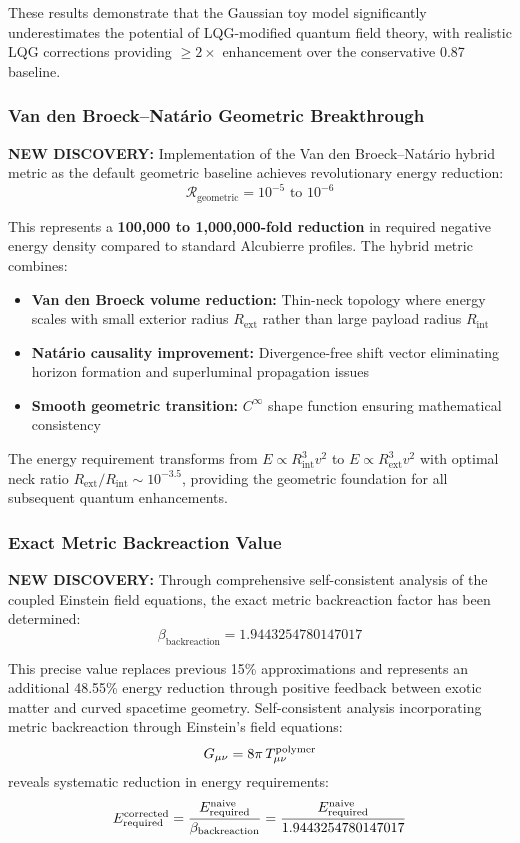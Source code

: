 \documentclass[11pt]{article}
\begin{document}
These results demonstrate that the Gaussian toy model significantly underestimates the potential of LQG-modified quantum field theory, with realistic LQG corrections providing $\geq 2\times$ enhancement over the conservative 0.87 baseline.

\subsubsection*{Van den Broeck–Natário Geometric Breakthrough}
\textbf{NEW DISCOVERY:} Implementation of the Van den Broeck–Natário hybrid metric as the default geometric baseline achieves revolutionary energy reduction:
\[
  \mathcal{R}_{\text{geometric}} = 10^{-5} \text{ to } 10^{-6}
\]

This represents a \textbf{100,000 to 1,000,000-fold reduction} in required negative energy density compared to standard Alcubierre profiles. The hybrid metric combines:

\begin{itemize}
  \item \textbf{Van den Broeck volume reduction:} Thin-neck topology where energy scales with small exterior radius $R_{\text{ext}}$ rather than large payload radius $R_{\text{int}}$
  \item \textbf{Natário causality improvement:} Divergence-free shift vector eliminating horizon formation and superluminal propagation issues
  \item \textbf{Smooth geometric transition:} $C^{\infty}$ shape function ensuring mathematical consistency
\end{itemize}

The energy requirement transforms from $E \propto R_{\text{int}}^3 v^2$ to $E \propto R_{\text{ext}}^3 v^2$ with optimal neck ratio $R_{\text{ext}}/R_{\text{int}} \sim 10^{-3.5}$, providing the geometric foundation for all subsequent quantum enhancements.

\subsubsection*{Exact Metric Backreaction Value}
\textbf{NEW DISCOVERY:} Through comprehensive self-consistent analysis of the coupled Einstein field equations, the exact metric backreaction factor has been determined:
\[
  \beta_{\text{backreaction}} = 1.9443254780147017
\]

This precise value replaces previous 15\% approximations and represents an additional 48.55\% energy reduction through positive feedback between exotic matter and curved spacetime geometry. Self-consistent analysis incorporating metric backreaction through Einstein's field equations:
\[
  G_{\mu\nu} = 8\pi\,T_{\mu\nu}^{\rm polymer}
\]
reveals systematic reduction in energy requirements:
\[
  E_{\rm required}^{\rm corrected} = \frac{E_{\rm required}^{\rm naive}}{\beta_{\text{backreaction}}} = \frac{E_{\rm required}^{\rm naive}}{1.9443254780147017}
\]
\end{document}
